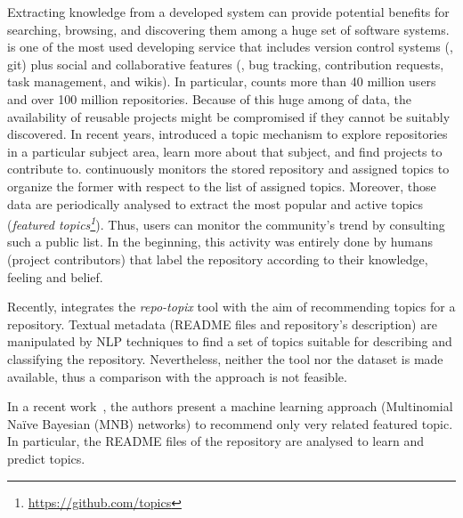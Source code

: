 Extracting knowledge from a developed system can provide potential benefits for searching, browsing, and discovering them among a huge set of software systems.
\GH is one of the most used developing service that includes version control systems (\ie, git) plus social and collaborative features (\eg,  bug tracking, contribution requests, task management, and wikis).
In particular, \GH counts more than 40 million users and over 100 million repositories. Because of this huge among of data, the availability of reusable projects might be compromised if they cannot be suitably discovered. In recent years, \GH introduced a topic mechanism to explore repositories in a particular subject area, learn more about that subject, and find projects to contribute to.
\GH continuously monitors the stored repository and assigned topics to organize the former with respect to the list of assigned topics. Moreover, those data are periodically analysed to extract the most popular and active topics (\ie \emph{featured topics\footnote{\url{https://github.com/topics}}}). Thus, users can monitor the community’s trend by consulting such a public list. In the beginning, this activity was entirely done by humans (\ie project contributors) that label the repository according to their knowledge, feeling and belief.

Recently, \GH integrates the \emph{repo-topix} tool with the aim of recommending topics for a \GH repository. Textual metadata (\ie README files and repository's description) are manipulated by NLP techniques to find a set of topics suitable for describing and classifying the repository. 
Nevertheless, neither the tool nor the dataset is made available,
thus a comparison with the approach is not feasible.

In a recent work~\cite{10.1145/3383219.3383227}, the authors present a machine learning approach (\ie Multinomial Na\"{i}ve Bayesian (MNB) networks) to recommend only very related featured topic. In particular, the README files of the repository are analysed to learn and predict \GH topics.

